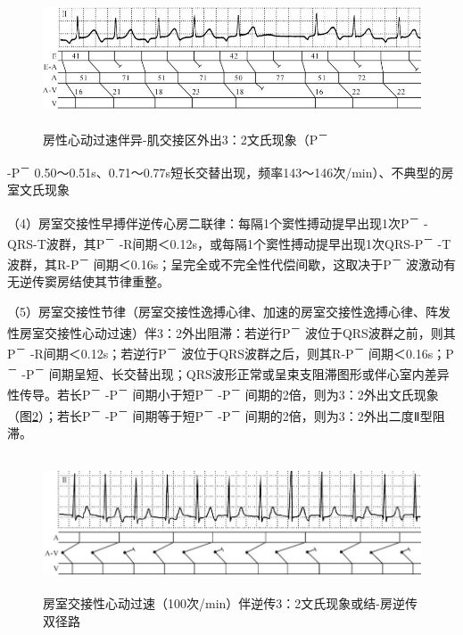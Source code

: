 \begin{figure}[!htbp]
 \centering
 \includegraphics[width=5.6875in,height=1.52083in]{./images/Image00601.jpg}
 \captionsetup{justification=centering}
 \caption{房性心动过速伴异-肌交接区外出3：2文氏现象（P\textsuperscript{－}}
 \label{fig37-7}
  \end{figure} 
-P\textsuperscript{－}
0.50～0.51s、0.71～0.77s短长交替出现，频率143～146次/min）、不典型的房室文氏现象

（4）房室交接性早搏伴逆传心房二联律：每隔1个窦性搏动提早出现1次P\textsuperscript{－}
-QRS-T波群，其P\textsuperscript{－}
-R间期＜0.12s，或每隔1个窦性搏动提早出现1次QRS-P\textsuperscript{－}
-T波群，其R-P\textsuperscript{－}
间期＜0.16s；呈完全或不完全性代偿间歇，这取决于P\textsuperscript{－}
波激动有无逆传窦房结使其节律重整。

（5）房室交接性节律（房室交接性逸搏心律、加速的房室交接性逸搏心律、阵发性房室交接性心动过速）伴3：2外出阻滞：若逆行P\textsuperscript{－}
波位于QRS波群之前，则其P\textsuperscript{－}
-R间期＜0.12s；若逆行P\textsuperscript{－}
波位于QRS波群之后，则其R-P\textsuperscript{－}
间期＜0.16s；P\textsuperscript{－} -P\textsuperscript{－}
间期呈短、长交替出现；QRS波形正常或呈束支阻滞图形或伴心室内差异性传导。若长P\textsuperscript{－}
-P\textsuperscript{－} 间期小于短P\textsuperscript{－}
-P\textsuperscript{－}
间期的2倍，则为3：2外出文氏现象（图\ref{fig37-8}）；若长P\textsuperscript{－}
-P\textsuperscript{－} 间期等于短P\textsuperscript{－}
-P\textsuperscript{－} 间期的2倍，则为3：2外出二度Ⅱ型阻滞。

\begin{figure}[!htbp]
 \centering
 \includegraphics[width=5.84375in,height=1.59375in]{./images/Image00602.jpg}
 \captionsetup{justification=centering}
 \caption{房室交接性心动过速（100次/min）伴逆传3：2文氏现象或结-房逆传双径路}
 \label{fig37-8}
  \end{figure} 

